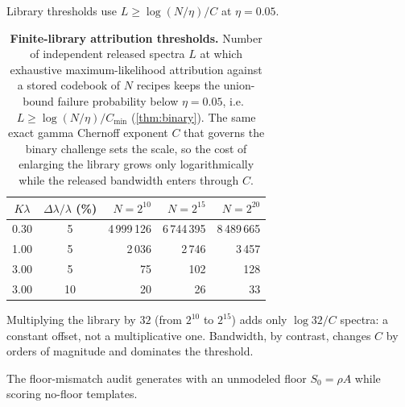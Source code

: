 \documentclass[11pt]{article}
\begin{document}
Library thresholds use \(L\ge\log(N/\eta)/C\) at \(\eta=0.05\).

\begin{table}[htbp]
\centering
\small
\renewcommand{\arraystretch}{1.15}
\caption{\textbf{Finite-library attribution thresholds.} Number of independent released spectra $L$ at which exhaustive maximum-likelihood attribution against a stored codebook of $N$ recipes keeps the union-bound failure probability below $\eta=0.05$, i.e.\ $L\ge\log(N/\eta)/C_{\min}$ (\cref{thm:binary}). The same exact gamma Chernoff exponent $C$ that governs the binary challenge sets the scale, so the cost of enlarging the library grows only logarithmically while the released bandwidth enters through $C$.}
\label{tab:library}
\setlength{\tabcolsep}{8pt}
\begin{tabular}{c c r r r}
\toprule
{$K\lambda$} & {$\Delta\lambda/\lambda$ (\%)} & {$N=2^{10}$} & {$N=2^{15}$} & {$N=2^{20}$} \\
\midrule
0.30 & 5 & 4\,999\,126 & 6\,744\,395 & 8\,489\,665 \\
1.00 & 5 & 2\,036 & 2\,746 & 3\,457 \\
3.00 & 5 & 75 & 102 & 128 \\
3.00 & 10 & 20 & 26 & 33 \\
\bottomrule
\end{tabular}
\par\vspace{3pt}
\begin{minipage}{0.92\linewidth}\footnotesize Multiplying the library by $32$ (from $2^{10}$ to $2^{15}$) adds only $\log 32/C$ spectra: a constant offset, not a multiplicative one. Bandwidth, by contrast, changes $C$ by orders of magnitude and dominates the threshold.\end{minipage}
\end{table}


The floor-mismatch audit generates with an unmodeled floor \(S_0=\rho A\) while scoring no-floor templates.
\end{document}
